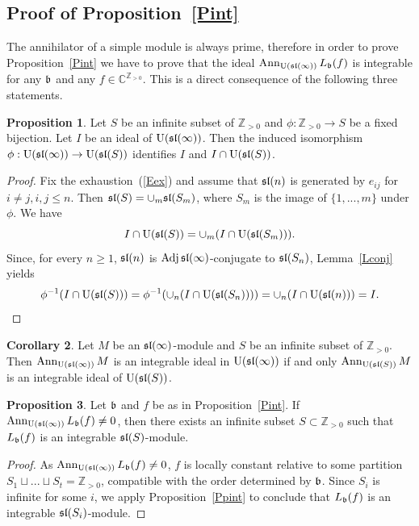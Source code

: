 \documentclass[10pt]{amsart}\oddsidemargin -1mm \evensidemargin -1mm \topmargin -15mm\headheight5mm \headsep 3.5mm \textheight 245mm\textwidth 170mm %
\theoremstyle{definition}\newtheorem{theorem}{Theorem}[section]\newtheorem{lemma}[theorem]{Lemma}\newtheorem{remark}[theorem]{Remark}\newtheorem{proposition}[theorem]{Proposition}\newtheorem{corollary}[theorem]{Corollary}\newtheorem{definition}[theorem]{Definition}\newtheorem{Ex}[theorem]{Example}
\begin{document}
\subsection{Proof of Proposition~\ref{Pint}}\label{SSint} %
The annihilator of a simple module is always prime, therefore in order to prove Proposition~\ref{Pint} we have to prove that the ideal $\operatorname{\mathrm{Ann}}_{\operatorname{\mathrm{U}}(\frak{sl}(\infty))} L_\frak b(f)$ is integrable for any $\frak b$ and any $f\in\mathbb C^{\mathbb Z_{>0}}$.
This is a direct consequence of the following three statements.

\begin{proposition}\label{Ppsisb}Let $S$ be an infinite subset of $\mathbb Z_{>0}$ and $\phi: \mathbb Z_{>0}\to S$ be a fixed bijection. Let $I$ be an ideal of $\operatorname{\mathrm{U}}(\frak{sl}(\infty))$. Then the induced isomorphism $\phi: \operatorname{\mathrm{U}}(\frak{sl}(\infty))\to \operatorname{\mathrm{U}}(\frak{sl}(S))$ identifies $I$ and $I\cap\operatorname{\mathrm{U}}(\frak{sl}(S))$.\end{proposition}
\begin{proof} Fix the exhaustion~(\ref{Eex}) and assume that $\frak{sl}(n)$ is generated by $e_{ij}$ for $i\ne j, i,j\le n$. Then $\frak{sl}(S)=\cup_m\frak{sl}(S_m)$, where $S_m$ is the image of $\{1,..., m\}$ under $\phi$. We have $$I\cap\operatorname{\mathrm{U}}(\frak{sl}(S))=\cup_m(I\cap\operatorname{\mathrm{U}}(\frak{sl}(S_m))).$$Since, for every $n\ge1$, $\frak{sl}(n)$ is $\operatorname{\mathrm{Adj}}\frak{sl}(\infty)$-conjugate to $\frak{sl}(S_n)$, Lemma~\ref{Lconj} yields $$\phi^{-1}(I\cap\operatorname{\mathrm{U}}(\frak{sl}(S)))=\phi^{-1}(\cup_n(I\cap\operatorname{\mathrm{U}}(\frak{sl}(S_n))))=\cup_n(I\cap\operatorname{\mathrm{U}}(\frak{sl}(n)))=I.$$
\end{proof}
\begin{corollary}\label{Psisb}Let $M$ be an $\frak{sl}(\infty)$-module and $S$ be an infinite subset of $\mathbb Z_{>0}$. Then $\operatorname{\mathrm{Ann}}_{\operatorname{\mathrm{U}}(\frak{sl}(\infty))}M$ is an integrable ideal in $\operatorname{\mathrm{U}}(\frak{sl}(\infty))$ if and only $\operatorname{\mathrm{Ann}}_{\operatorname{\mathrm{U}}(\frak{sl}(S))}M$ is an integrable ideal of $\operatorname{\mathrm{U}}(\frak{sl}(S))$.\end{corollary}


\begin{proposition}\label{Psai}Let $\frak b$ and $f$ be as in Proposition~\ref{Pint}. If $\operatorname{\mathrm{Ann}}_{\operatorname{\mathrm{U}}(\frak{sl}(\infty))} L_\frak b(f)\ne0$, then there exists an infinite subset $S\subset\mathbb Z_{>0}$
such that $L_\frak b(f)$ is an integrable
$\frak{sl}(S)$-module.\end{proposition}
\begin{proof}%
As $\operatorname{\mathrm{Ann}}_{\operatorname{\mathrm{U}}(\frak{sl}(\infty))} L_\frak b(f)\ne0$, $f$ is locally constant relative to some partition $S_1\sqcup...\sqcup S_t=\mathbb Z_{>0}$, compatible with the order determined by $\frak b$. Since $S_i$ is infinite for some $i$, we apply Proposition~\ref{Ppint} to conclude that $L_\frak b(f)$ is an integrable $\frak{sl}(S_i)$-module.\end{proof}
\end{document}
